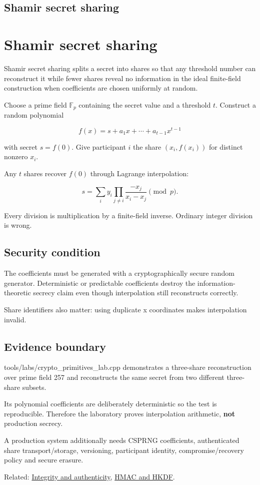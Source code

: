 \hypertarget{appendix-5888fd6102dc}{}
\section*{Shamir secret sharing}
\chapter{Shamir secret sharing}\label{appendix-5888fd6102dc-shamir-secret-sharing}

Shamir secret sharing splits a secret into shares so that any threshold number can reconstruct it while fewer shares reveal no information in the ideal finite-field construction when coefficients are chosen uniformly at random.

Choose a prime field \(\mathbb F_p\) containing the secret value and a threshold \(t\). Construct a random polynomial

\[
f(x)=s+a_1x+\cdots+a_{t-1}x^{t-1}
\]

with secret \(s=f(0)\). Give participant \(i\) the share \((x_i,f(x_i))\) for distinct nonzero \(x_i\).

Any \(t\) shares recover \(f(0)\) through Lagrange interpolation:

\[
s=
\sum_i y_i
\prod_{j\ne i}
\frac{-x_j}{x_i-x_j}
\pmod p.
\]

Every division is multiplication by a finite-field inverse. Ordinary integer division is wrong.

\section{Security condition}\label{appendix-5888fd6102dc-security-condition}

The coefficients must be generated with a cryptographically secure random generator. Deterministic or predictable coefficients destroy the information-theoretic secrecy claim even though interpolation still reconstructs correctly.

Share identifiers also matter: using duplicate x coordinates makes interpolation invalid.

\section{Evidence boundary}\label{appendix-5888fd6102dc-evidence-boundary}

tools/labs/crypto\_primitives\_lab.cpp demonstrates a three-share reconstruction over prime field 257 and reconstructs the same secret from two different three-share subsets.

Its polynomial coefficients are deliberately deterministic so the test is reproducible. Therefore the laboratory proves interpolation arithmetic, \textbf{not} production secrecy.

A production system additionally needs CSPRNG coefficients, authenticated share transport/storage, versioning, participant identity, compromise/recovery policy and secure erasure.

Related: \hyperref[appendix-cbe594d1ab0a]{Integrity and authenticity}, \hyperref[appendix-50af792c9da7]{HMAC and HKDF}.
